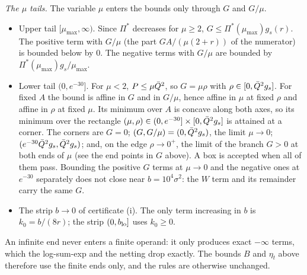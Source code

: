 \emph{The $\mu$ tails.}
The variable $\mu$ enters the bounds only through $G$ and $G/\mu$.
\begin{itemize}
\item Upper tail $[\mu_{\max},\infty)$.
  Since $\Pi^*$ decreases for $\mu\ge2$, $G\le\Pi^*(\mu_{\max})g_s(r)$.
  The positive term with $G/\mu$ (the part $GA/(\mu(2+r))$ of the numerator) is bounded below by $0$.
  The negative terms with $G/\mu$ are bounded by $\Pi^*(\mu_{\max})g_s/\mu_{\max}$.
\item Lower tail $(0,e^{-30}]$.
  For $\mu<2$, $P\le\mu\bar Q^2$, so $G=\mu\rho$ with $\rho\in[0,\bar Q^2g_s]$.
  For fixed $A$ the bound is affine in $G$ and in $G/\mu$, hence affine in $\mu$ at fixed $\rho$ and affine in $\rho$ at fixed $\mu$.
  Its minimum over $A$ is concave along both axes, so its minimum over the rectangle $(\mu,\rho)\in(0,e^{-30}]\times[0,\bar Q^2g_s]$ is attained at a corner.
  The corners are $G=0$; $(G,G/\mu)=(0,\bar Q^2g_s)$, the limit $\mu\to0$; $(e^{-30}\bar Q^2g_s,\bar Q^2g_s)$; and, on the edge $\rho\to0^+$, the limit of the branch $G>0$ at both ends of $\mu$ (see the end points in $G$ above).
  A box is accepted when all of them pass.
  Bounding the positive $G$ terms at $\mu\to0$ and the negative ones at $e^{-30}$ separately does not close near $b=10^4\sigma^2$: the $W$ term and its remainder carry the same $G$.
\item The strip $b\to0$ of certificate (i).
  The only term increasing in $b$ is $k_0=b/(8r)$; the strip $(0,b_{\rm lo}]$ uses $k_0\ge0$.
\end{itemize}
An infinite end never enters a finite operand: it only produces exact $-\infty$ terms, which the log-sum-exp and the netting drop exactly.
The bounds $B$ and $\eta_t$ above therefore use the finite ends only, and the rules are otherwise unchanged.

